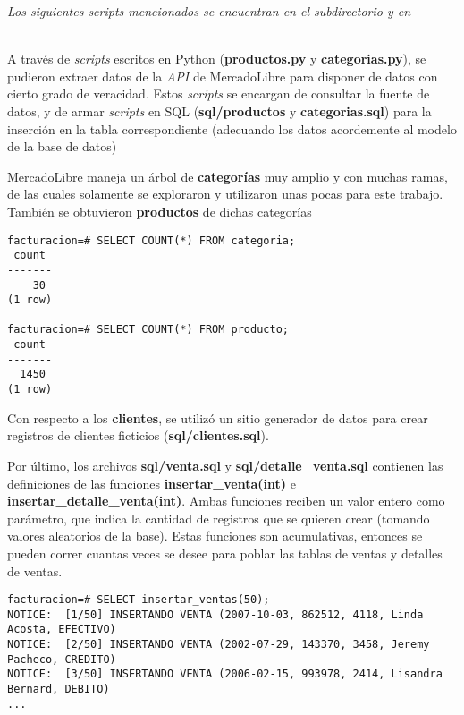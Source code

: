 \emph{Los siguientes \emph{scripts} mencionados se encuentran en el subdirectorio  y en } 

~\\

A través de \emph{scripts} escritos en Python (\textbf{productos.py} y \textbf{categorias.py}), se pudieron extraer datos de la \emph{API} de MercadoLibre \autocite{api} para disponer de datos con cierto grado de veracidad. Estos \emph{scripts} se encargan de consultar la fuente de datos, y de armar \emph{scripts} en SQL (\textbf{sql/productos} y \textbf{categorias.sql}) para la inserción en la tabla correspondiente (adecuando los datos acordemente al modelo de la base de datos)  

MercadoLibre maneja un árbol de \textbf{categorías} muy amplio y con muchas ramas, de las cuales solamente se exploraron y utilizaron unas pocas para este trabajo. También se obtuvieron \textbf{productos} de dichas categorías

\vspace*{5mm}
\begin{lstlisting}[title=Cantidad de categorías y productos disponibles en el sistema de facturación viejo]
facturacion=# SELECT COUNT(*) FROM categoria;
 count 
-------
    30
(1 row)

facturacion=# SELECT COUNT(*) FROM producto;
 count 
-------
  1450
(1 row)
\end{lstlisting}

Con respecto a los \textbf{clientes}, se utilizó un sitio generador de datos \autocite{data} para crear registros de clientes ficticios (\textbf{sql/clientes.sql}). 

Por último, los archivos \textbf{sql/venta.sql} y \textbf{sql/detalle\_venta.sql} contienen las definiciones de las funciones \textbf{insertar\_venta(int)} e \textbf{insertar\_detalle\_venta(int)}. Ambas funciones reciben un valor entero como parámetro, que indica la cantidad de registros que se quieren crear (tomando valores aleatorios de la base). Estas funciones son acumulativas, entonces se pueden correr cuantas veces se desee para poblar las tablas de ventas y detalles de ventas.

\vspace*{5mm}
\begin{lstlisting}[title=Inserción de 50 ventas aleatorias en la BD]
facturacion=# SELECT insertar_ventas(50);
NOTICE:  [1/50] INSERTANDO VENTA (2007-10-03, 862512, 4118, Linda Acosta, EFECTIVO)
NOTICE:  [2/50] INSERTANDO VENTA (2002-07-29, 143370, 3458, Jeremy Pacheco, CREDITO)
NOTICE:  [3/50] INSERTANDO VENTA (2006-02-15, 993978, 2414, Lisandra Bernard, DEBITO)
...
\end{lstlisting}

